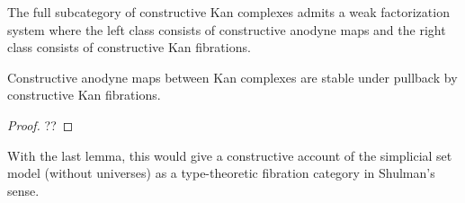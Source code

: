 \documentclass[reqno,10pt,a4paper,oneside]{amsart}
\begin{document}
\begin{corollary}
\label{wfs-anodyne-fibration}
The full subcategory of constructive Kan complexes admits a weak factorization system where the left class consists of constructive anodyne maps and the right class consists of constructive Kan fibrations.
\end{corollary}

\begin{lemma}
Constructive anodyne maps between Kan complexes are stable under pullback by constructive Kan fibrations.
\end{lemma}

\begin{proof}
??
\end{proof}

With the last lemma, this would give a constructive account of the simplicial set model (without universes) as a type-theoretic fibration category in Shulman's sense.



\end{document}
